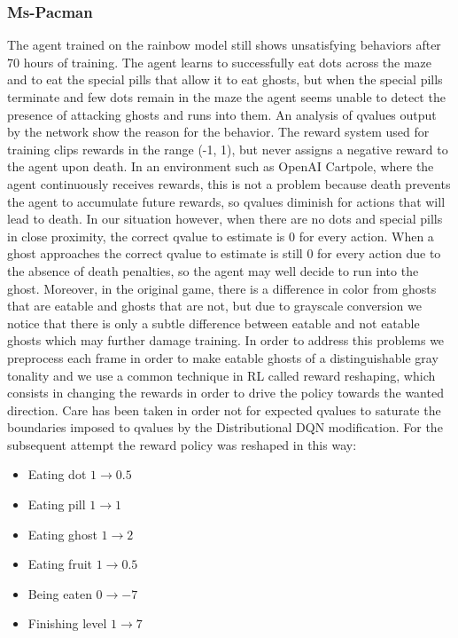 \documentclass[10pt,twocolumn,letterpaper]{article}
\begin{document}
\subsubsection{Ms-Pacman}
The agent trained on the rainbow model still shows unsatisfying behaviors after 70 hours of training. The agent learns to successfully eat dots across the maze and to eat the special pills that allow it to eat ghosts, but when the special pills terminate and few dots remain in the maze the agent seems unable to detect the presence of attacking ghosts and runs into them.
An analysis of qvalues output by the network show the reason for the behavior. The reward system used for training clips rewards in the range (-1, 1), but never assigns a negative reward to the agent upon death. In an environment such as OpenAI Cartpole, where the agent continuously receives rewards, this is not a problem because death prevents the agent to accumulate future rewards, so qvalues diminish for actions that will lead to death. In our situation however, when there are no dots and special pills in close proximity, the correct qvalue to estimate is 0 for every action. When a ghost approaches the correct qvalue to estimate is still 0 for every action due to the absence of death penalties, so the agent may well decide to run into the ghost. Moreover, in the original game, there is a difference in color from ghosts that are eatable and ghosts that are not, but due to grayscale conversion we notice that there is only a subtle difference between eatable and not eatable ghosts which may further damage training.
In order to address this problems we preprocess each frame in order to make eatable ghosts of a distinguishable gray tonality and we use a common technique in RL called reward reshaping, which consists in changing the rewards in order to drive the policy towards the wanted direction.
Care has been taken in order not for expected qvalues to saturate the boundaries imposed to qvalues by the Distributional DQN modification. For the subsequent attempt the reward policy was reshaped in this way:
\begin{itemize}
	\item Eating dot $1 \rightarrow 0.5$
	\item Eating pill $1 \rightarrow 1$
	\item Eating ghost $1 \rightarrow 2$
	\item Eating fruit $1 \rightarrow 0.5$
	\item Being eaten $0 \rightarrow -7$
	\item Finishing level $1 \rightarrow 7$
\end{itemize}
\end{document}
